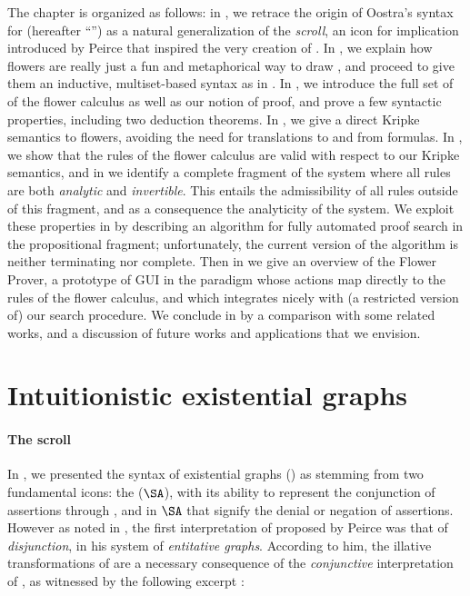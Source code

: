 The chapter is organized as follows: in , we retrace the origin of
Oostra's syntax for   (hereafter ``'') as a
natural generalization of the \emph{scroll}, an icon for implication introduced
by Peirce that inspired the very creation of . In , we
explain how flowers are really just a fun and metaphorical way to draw
, and proceed to give them an inductive, multiset-based syntax as in
. In , we introduce the full set of  of the flower calculus as well as our notion of proof, and prove a few
syntactic properties, including two deduction theorems. In ,
we give a direct Kripke semantics to flowers, avoiding the need for translations
to and from formulas. In , we show that the rules of the
flower calculus are valid with respect to our Kripke semantics, and in
 we identify a complete fragment of the system where all
rules are both \emph{analytic} and \emph{invertible}. This entails the
admissibility of all rules outside of this fragment, and as a consequence the
analyticity of the system. We exploit these properties in
 by describing an algorithm for fully automated proof
search in the propositional fragment; unfortunately, the current version of the
algorithm is neither terminating nor complete. Then in 
we give an overview of the Flower Prover, a prototype of GUI in the
 paradigm whose actions map directly to the rules of the flower
calculus, and which integrates nicely with (a restricted version of) our search
procedure. We conclude in  by a comparison with some related
works, and a discussion of future works and applications that we envision.


\section{Intuitionistic existential graphs}

\paragraph{The scroll}

In , we presented the syntax of existential graphs () as
stemming from two fundamental icons: the  ($\SA$),
with its ability to represent the conjunction of assertions through
\emph{}, and \emph{} in $\SA$ that signify the denial or
negation of assertions. However as noted in , the first
interpretation of  proposed by Peirce was that of
\emph{disjunction}, in his system of \emph{entitative graphs}. According to him,
the illative transformations of  are a necessary consequence of the
\emph{conjunctive} interpretation of , as witnessed by the
following excerpt :

